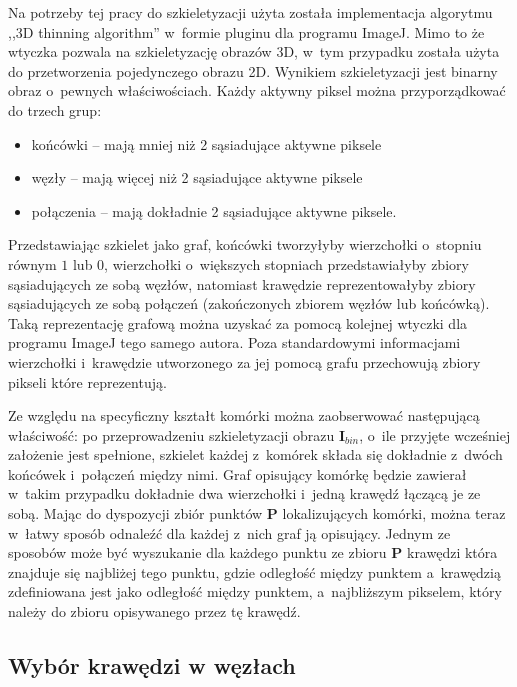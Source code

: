 \documentclass[declaration,shortabstract,mgr]{iithesis}
\newcommand{\image}{\mathbf{I}}
\begin{document}
Na potrzeby tej pracy do szkieletyzacji użyta została implementacja algorytmu ,,3D thinning algorithm''\cite{algo:3d-thinning} w~formie pluginu dla programu ImageJ\cite{plugin:skeletonize-3d}.
Mimo to że wtyczka pozwala na szkieletyzację obrazów 3D, w~tym przypadku została użyta do przetworzenia pojedynczego obrazu 2D.
Wynikiem szkieletyzacji jest binarny obraz o~pewnych właściwościach.
Każdy aktywny piksel można przyporządkować do trzech grup:
\begin{itemize}
  \item końcówki -- mają mniej niż 2 sąsiadujące aktywne piksele
  \item węzły -- mają więcej niż 2 sąsiadujące aktywne piksele
  \item połączenia -- mają dokładnie 2 sąsiadujące aktywne piksele.
\end{itemize}
Przedstawiając szkielet jako graf, końcówki tworzyłyby wierzchołki o~stopniu równym $1$ lub $0$, wierzchołki o~większych stopniach przedstawiałyby zbiory sąsiadujących ze sobą węzłów, natomiast krawędzie reprezentowałyby zbiory sąsiadujących ze sobą połączeń (zakończonych zbiorem węzłów lub końcówką). Taką reprezentację grafową można uzyskać za pomocą kolejnej wtyczki dla programu ImageJ tego samego autora\cite{plugin:analyze-skeleton}. Poza standardowymi informacjami wierzchołki i~krawędzie utworzonego za jej pomocą grafu przechowują zbiory pikseli które reprezentują.

Ze względu na specyficzny kształt komórki można zaobserwować następującą właściwość: po przeprowadzeniu szkieletyzacji obrazu $\image_{bin}$, o~ile przyjęte wcześniej założenie jest spełnione, szkielet każdej z~komórek składa się dokładnie z~dwóch końcówek i~połączeń między nimi. Graf opisujący komórkę będzie zawierał w~takim przypadku dokładnie dwa wierzchołki i~jedną krawędź łączącą je ze sobą. Mając do dyspozycji zbiór punktów $\mathbf{P}$ lokalizujących komórki, można teraz w~łatwy sposób odnaleźć dla każdej z~nich graf ją opisujący. Jednym ze sposobów może być wyszukanie dla każdego punktu ze zbioru $\mathbf{P}$ krawędzi która znajduje się najbliżej tego punktu, gdzie odległość między punktem a~krawędzią zdefiniowana jest jako odległość między punktem, a~najbliższym pikselem, który należy do zbioru opisywanego przez tę krawędź.

\subsection{Wybór krawędzi w węzłach}
\label{sec:spine-extending}
\end{document}
